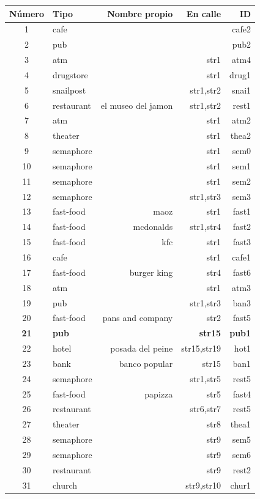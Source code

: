 \begin{table}[H]
{\footnotesize
\begin{center}
\begin{tabular}{|c|l|r|r|r|}
\hline
N\'umero&Tipo & Nombre propio & En calle & ID\\
\hline

1&cafe & & & cafe2 \\
2&pub	& & & pub2 \\
3&atm	& & str1 & atm4 \\
4&drugstore & & str1 & drug1\\
5&snailpost & & str1,str2 & snai1\\
6&restaurant & el museo del jamon & str1,str2 & rest1\\
7&atm	& & str1 & atm2\\
8&theater & & str1 & thea2\\
9&semaphore & & str1 & sem0\\
10&semaphore & & str1 & sem1\\
11&semaphore & & str1 & sem2\\
12&semaphore & & str1,str3 & sem3\\
13&fast-food & maoz & str1 & fast1\\
14&fast-food & mcdonalds & str1,str4 & fast2\\
15&fast-food & kfc & str1 & fast3\\
16&cafe & & str1 & cafe1\\
17&fast-food & burger king & str4 & fast6\\
18&atm	& & str1 & atm3\\
19&pub	& & str1,str3 & ban3\\
20&fast-food & pans and company & str2 & fast5\\
\textbf{21}&\textbf{pub}	& & \textbf{str15} & \textbf{pub1}\\
22&hotel & posada del peine & str15,str19 & hot1\\
23&bank & banco popular & str15 & ban1\\
24&semaphore & & str1,str5 & rest5\\
25&fast-food & papizza & str5 & fast4\\
26&restaurant	& & str6,str7 & rest5\\
27&theater	& & str8 & thea1\\
28&semaphore & & str9 & sem5\\
29&semaphore & & str9 & sem6\\
30&restaurant & & str9 & rest2\\
31&church	& & str9,str10 & chur1\\

\end{tabular}
\end{center}}
\end{table}
